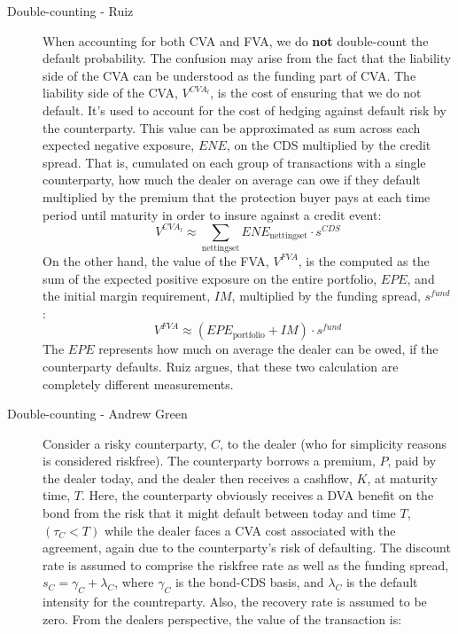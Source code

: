 \documentclass[10pt,a4paper]{article}
\begin{document}
        \begin{description}
            \item[Double-counting - Ruiz]
            When accounting for both CVA and FVA, we do \textbf{not} double-count the default probability. The confusion may arise from the fact that the liability side of the CVA can be understood as the funding part of CVA. The liability side of the CVA, $V^{CVA_l}$, is the cost of ensuring that we do not default. It's used to account for the cost of hedging against default risk by the counterparty. This value can be approximated as sum across each expected negative exposure, $ENE$, on the CDS multiplied by the credit spread. That is, cumulated on each group of transactions with a single counterparty, how much the dealer on average can owe if they default multiplied by the premium that the protection buyer pays at each time period until maturity in order to insure against a credit event:
            \begin{equation}
                V^{CVA_l} \approx \sum_{\text{nettingset}} ENE_{\text{nettingset}} \cdot s^{CDS}
            \end{equation}
            On the other hand, the value of the FVA, $V^{FVA}$, is the computed as the sum of the expected positive exposure on the entire portfolio, $EPE$, and the initial margin requirement, $IM$, multiplied by the funding spread, $s^{fund}$:
            \begin{equation}
                V^{FVA} \approx (EPE_{\text{portfolio}}+IM)\cdot s^{fund}
            \end{equation}
            The $EPE$ represents how much on average the dealer can be owed, if the counterparty defaults. Ruiz argues, that these two calculation are completely different measurements.
            \item[Double-counting - Andrew Green]
            Consider a risky counterparty, $C$, to the dealer (who for simplicity reasons is considered riskfree). The counterparty borrows a premium, $P$, paid by the dealer today, and the dealer then receives a cashflow, $K$, at maturity time, $T$. Here, the counterparty obviously receives a DVA benefit on the bond from the risk that it might default between today and time $T$, $(\tau_C < T)$ while the dealer faces a CVA cost associated with the agreement, again due to the counterparty's risk of defaulting. The discount rate is assumed to comprise the riskfree rate as well as the funding spread, $s_{C} = \gamma_C + \lambda_C$, where $\gamma_C$ is the bond-CDS basis, and $\lambda_C$ is the default intensity for the countreparty. Also, the recovery rate is assumed to be zero. From the dealers perspective, the value of the transaction is:

\end{description}
\end{document}
